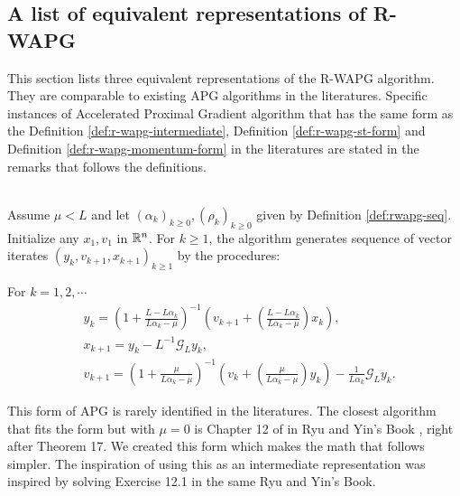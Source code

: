 \documentclass[12pt]{article}
\begin{document}
    \subsection{A list of equivalent representations of R-WAPG}
        This section lists three equivalent representations of the R-WAPG algorithm. 
        They are comparable to existing APG algorithms in the literatures. 
        Specific instances of Accelerated Proximal Gradient algorithm that has the same form as the Definition \ref{def:r-wapg-intermediate}, Definition \ref{def:r-wapg-st-form} and Definition \ref{def:r-wapg-momentum-form} in the literatures are stated in the remarks that follows the definitions. 

        \begin{definition}\label{def:r-wapg-intermediate}\;\\
            Assume $\mu < L$ and let $(\alpha_k)_{k \ge 0}, (\rho_k)_{k \ge 0}$ given by Definition \ref{def:rwapg-seq}. 
            Initialize any $x_1, v_1$ in $\mathbb R^n$. 
            For $k \ge 1$, the algorithm generates sequence of vector iterates $(y_{k}, v_{k + 1}, x_{k + 1})_{k \ge 1}$ by the procedures: 
            \begin{tcolorbox}
                For $k = 1, 2, \cdots$
                \begin{align*} 
                    & y_{k} = 
                    \left(
                        1 + \frac{L - L\alpha_{k}}{L\alpha_{k} - \mu}
                    \right)^{-1}
                    \left(
                        v_{k + 1} + 
                        \left(\frac{L - L\alpha_{k}}{L\alpha_{k} - \mu} \right) x_{k}
                    \right), 
                    \\
                    & x_{k + 1} = 
                    y_k - L^{-1} \mathcal G_L y_k, 
                    \\
                    & v_{k + 1} = 
                    \left(
                        1 + \frac{\mu}{L \alpha_k - \mu}
                    \right)^{-1}
                    \left(
                        v_k + 
                        \left(\frac{\mu}{L \alpha_k - \mu}\right) y_k
                    \right) - \frac{1}{L\alpha_{k}}\mathcal G_L y_k. 
                \end{align*}
            \end{tcolorbox}
        \end{definition}
        \begin{remark}
            This form of APG is rarely identified in the literatures. 
            The closest algorithm that fits the form but with $\mu = 0$ is Chapter 12 of in Ryu and Yin's Book \cite{ryu_large-scale_2022}, right after Theorem 17. 
            We created this form which makes the math that follows simpler. 
            The inspiration of using this as an intermediate representation was inspired by solving Exercise 12.1 in the same Ryu and Yin's Book. 
        \end{remark}
\end{document}
